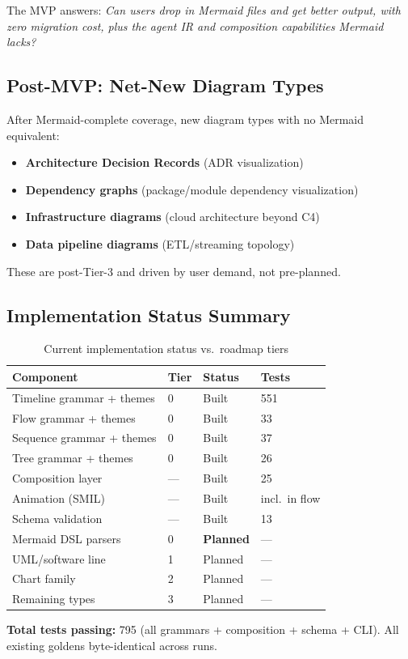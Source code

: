 The MVP answers: \emph{Can users drop in Mermaid files and get better output, with zero
migration cost, plus the agent IR and composition capabilities Mermaid lacks?}

\subsection{Post-MVP: Net-New Diagram Types}

After Mermaid-complete coverage, new diagram types with no Mermaid equivalent:
\begin{itemize}
  \item \textbf{Architecture Decision Records} (ADR visualization)
  \item \textbf{Dependency graphs} (package/module dependency visualization)
  \item \textbf{Infrastructure diagrams} (cloud architecture beyond C4)
  \item \textbf{Data pipeline diagrams} (ETL/streaming topology)
\end{itemize}

These are post-Tier-3 and driven by user demand, not pre-planned.

\subsection{Implementation Status Summary}

\begin{table}[h]
\centering\small
\caption{Current implementation status vs.\ roadmap tiers}
\begin{tabular}{llll}
\toprule
\textbf{Component} & \textbf{Tier} & \textbf{Status} & \textbf{Tests} \\
\midrule
Timeline grammar + themes   & 0 & Built & 551 \\
Flow grammar + themes       & 0 & Built & 33 \\
Sequence grammar + themes   & 0 & Built & 37 \\
Tree grammar + themes       & 0 & Built & 26 \\
Composition layer           & --- & Built & 25 \\
Animation (SMIL)            & --- & Built & incl.\ in flow \\
Schema validation           & --- & Built & 13 \\
Mermaid DSL parsers         & 0 & \textbf{Planned} & --- \\
UML/software line           & 1 & Planned & --- \\
Chart family                & 2 & Planned & --- \\
Remaining types             & 3 & Planned & --- \\
\bottomrule
\end{tabular}
\label{tab:implementation-status}
\end{table}

\textbf{Total tests passing:} 795 (all grammars + composition + schema + CLI).
All existing goldens byte-identical across runs.
